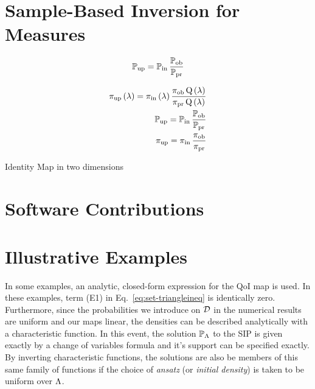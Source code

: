 \pagebreak
\section{Sample-Based Inversion for Measures}\label{sec:ch02-sample}

\begin{equation}
\updatedP = \initialP \frac{\observedP}{\predictedP}
\end{equation}

\begin{equation}
\begin{split}
\dci\\
\dciP\\
\dciD
\end{split}
\end{equation}


\FloatBarrier

\FloatBarrier

\FloatBarrier
Identity Map in two dimensions

\FloatBarrier





\section{Software Contributions}\label{sec:ch02-software}

\FloatBarrier

\section{Illustrative Examples}\label{sec:ch02-examples}
In some examples, an analytic, closed-form expression for the QoI map is used.
In these examples, term (E1) in Eq.~\eqref{eq:set-triangleineq} is identically zero.
Furthermore, since the probabilities we introduce on $\dspace$ in the numerical results are uniform and our maps linear, the densities can be described analytically with a characteristic function.
In this event, the solution $\paramP$ to the SIP is given exactly by a change of variables formula and it's support can be specified exactly.
By inverting characteristic functions, the solutions are also be members of this same family of functions if the choice of \emph{ansatz} (or \emph{initial density}) is taken to be uniform over $\pspace$.

